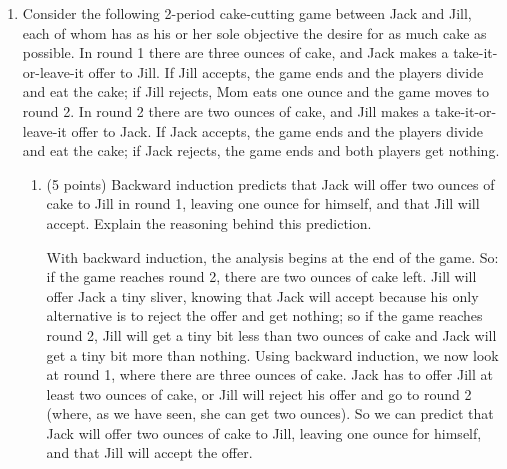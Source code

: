 \documentclass[twoside]{article}
\begin{document}
\begin{enumerate}
\begin{enumerate}
\begin{KEY}
Backward induction predicts an outcome of (M: 70, PE: 0).
\end{KEY}

    \item \begin{EXAM} (5 points) Is this outcome Pareto efficient? Yes  No  (Circle one. If it is not Pareto efficient, identify, e.g., with a star, a Pareto improvement.) \end{EXAM}

\begin{KEY}
No; a Pareto improvement is (M: 100, PE: 0).
\end{KEY}

    \end{enumerate}


\clearpage


\item \begin{EXAM} Consider the following 2-period cake-cutting game between Jack and Jill, each of whom has as his or her sole objective the desire for as much cake as possible. In round 1 there are three ounces of cake, and Jack makes a take-it-or-leave-it offer to Jill. If Jill accepts, the game ends and the players divide and eat the cake; if Jill rejects, Mom eats one ounce and the game moves to round 2. In round 2 there are two ounces of cake, and Jill makes a take-it-or-leave-it offer to Jack. If Jack accepts, the game ends and the players divide and eat the cake; if Jack rejects, the game ends and both players get nothing. \end{EXAM}

    \begin{enumerate}
    \item \begin{EXAM} (5 points) Backward induction predicts that Jack will offer two ounces of cake to Jill in round 1, leaving one ounce for himself, and that Jill will accept. Explain the reasoning behind this prediction.
    \vspace*{2.6in}\end{EXAM}

\begin{KEY}
With backward induction, the analysis begins at the end of the game. So: if the game reaches round 2, there are two ounces of cake left. Jill will offer Jack a tiny sliver, knowing that Jack will accept because his only alternative is to reject the offer and get nothing; so if the game reaches round 2, Jill will get a tiny bit less than two ounces of cake and Jack will get a tiny bit more than nothing. Using backward induction, we now look at round 1, where there are three ounces of cake. Jack has to offer Jill at least two ounces of cake, or Jill will reject his offer and go to round 2 (where, as we have seen, she can get two ounces). So we can predict that Jack will offer two ounces of cake to Jill, leaving one ounce for himself, and that Jill will accept the offer.


\end{KEY}
\end{enumerate}
\end{enumerate}
\end{document}
